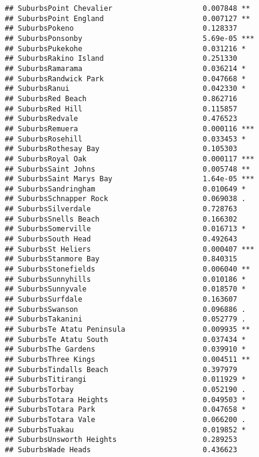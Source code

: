\documentclass[
]{article}
\begin{document}
\begin{verbatim}
## SuburbsPoint Chevalier                     0.007848 ** 
## SuburbsPoint England                       0.007127 ** 
## SuburbsPokeno                              0.128337    
## SuburbsPonsonby                            5.69e-05 ***
## SuburbsPukekohe                            0.031216 *  
## SuburbsRakino Island                       0.251330    
## SuburbsRamarama                            0.036214 *  
## SuburbsRandwick Park                       0.047668 *  
## SuburbsRanui                               0.042330 *  
## SuburbsRed Beach                           0.862716    
## SuburbsRed Hill                            0.115857    
## SuburbsRedvale                             0.476523    
## SuburbsRemuera                             0.000116 ***
## SuburbsRosehill                            0.033453 *  
## SuburbsRothesay Bay                        0.105303    
## SuburbsRoyal Oak                           0.000117 ***
## SuburbsSaint Johns                         0.005748 ** 
## SuburbsSaint Marys Bay                     1.64e-05 ***
## SuburbsSandringham                         0.010649 *  
## SuburbsSchnapper Rock                      0.069038 .  
## SuburbsSilverdale                          0.728763    
## SuburbsSnells Beach                        0.166302    
## SuburbsSomerville                          0.016713 *  
## SuburbsSouth Head                          0.492643    
## SuburbsSt Heliers                          0.000407 ***
## SuburbsStanmore Bay                        0.840315    
## SuburbsStonefields                         0.006040 ** 
## SuburbsSunnyhills                          0.010186 *  
## SuburbsSunnyvale                           0.018570 *  
## SuburbsSurfdale                            0.163607    
## SuburbsSwanson                             0.096886 .  
## SuburbsTakanini                            0.052779 .  
## SuburbsTe Atatu Peninsula                  0.009935 ** 
## SuburbsTe Atatu South                      0.037434 *  
## SuburbsThe Gardens                         0.039910 *  
## SuburbsThree Kings                         0.004511 ** 
## SuburbsTindalls Beach                      0.397979    
## SuburbsTitirangi                           0.011929 *  
## SuburbsTorbay                              0.052190 .  
## SuburbsTotara Heights                      0.049503 *  
## SuburbsTotara Park                         0.047658 *  
## SuburbsTotara Vale                         0.066200 .  
## SuburbsTuakau                              0.019852 *  
## SuburbsUnsworth Heights                    0.289253    
## SuburbsWade Heads                          0.436623    

\end{verbatim}
\end{document}
